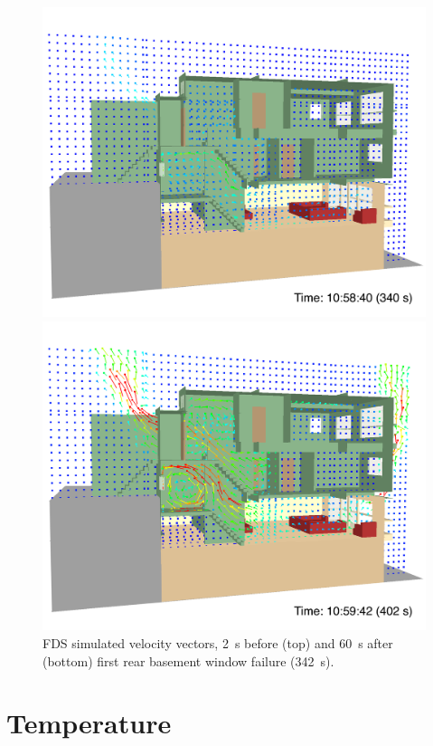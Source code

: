 \documentclass[12pt,oneside]{book}
\begin{document}
\begin{figure}[!ht]
\includegraphics[width=4.5in]{../Figures/SMV_Vel_Vec_340_s}


\includegraphics[width=4.5in]{../Figures/SMV_Vel_Vec_402_s}


\caption{FDS simulated velocity vectors, 2~s before (top) and 60~s after (bottom) first rear basement window failure (342~s).}
\label{fig:smv_velocity_vectors}
\end{figure}


\clearpage


\section{Temperature}
\label{sec:temperature}
\end{document}
